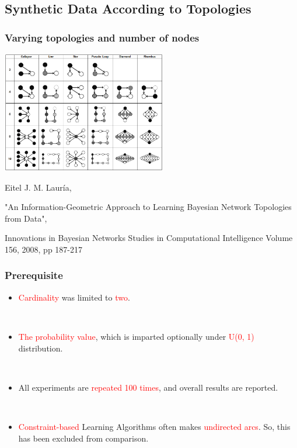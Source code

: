 \documentclass{beamer}
\begin{document}
\subsection{Synthetic Data According to Topologies}
\begin{frame}
\frametitle{Varying topologies and number of nodes}
{\scriptsize{}
	\begin{center}
		\includegraphics[height=150pt]{images/image21}
	\end{center}		
}
\tiny{
		Eitel J. M. Lauría,
		
		"An Information-Geometric Approach to Learning Bayesian Network Topologies from Data",
		
		Innovations in Bayesian Networks Studies in Computational Intelligence Volume 156, 2008, pp 187-217
		}
\end{frame}


\begin{frame}
\frametitle{Prerequisite}
{\scriptsize{}
	\begin{itemize}
		\item \textcolor{red}{Cardinality} was limited to \textcolor{red}{two}.

		{}\

		\item \textcolor{red}{The probability value}, which is imparted optionally under \textcolor{red}{U(0, 1)} distribution.

		{}\

		\item All experiments are \textcolor{red}{repeated 100 times}, and overall results are reported.
		
		{}\		
		
		\item \textcolor{red}{Constraint-based} Learning Algorithms often makes \textcolor{red}{undirected arcs}. So, this has been excluded from comparison.
		
	\end{itemize}
}
\end{frame}
\end{document}
